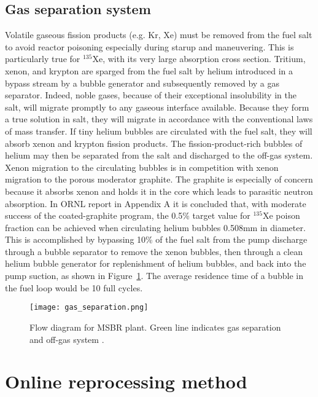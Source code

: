 \subsection{Gas separation system}
Volatile gaseous fission products (e.g. Kr, Xe) must be removed from the fuel salt to avoid reactor poisoning especially during starup and maneuvering. This is particularly true for $^{135}$Xe, with its very large absorption cross section. Tritium, xenon, and krypton are sparged from the fuel salt by helium introduced in a bypass stream by a bubble generator and subsequently removed by a gas separator. Indeed, noble gases, because of their exceptional insolubility in the salt, will migrate promptly to any gaseous interface available. Because they form a true solution in salt, they will migrate in accordance with the conventional laws of mass transfer.
If tiny helium bubbles are circulated with the fuel salt, they will absorb xenon and krypton fission products. The fission-product-rich bubbles of helium may then be separated from the salt and discharged to the off-gas system. Xenon migration to the circulating bubbles is in competition with xenon migration to the porous moderator graphite. The graphite is especially of concern because it absorbs xenon and holds it in the core which leads to parasitic neutron absorption. In \gls{ORNL} report \cite{robertson_conceptual_1971} in Appendix A it is concluded that, with moderate success of the coated-graphite program, the 0.5\% target value for $^{135}$Xe poison fraction can be achieved when circulating helium bubbles 0.508mm in diameter. This is accomplished by bypassing 10\% of the fuel salt from
the pump discharge through a bubble separator to remove the xenon bubbles, then through a clean helium bubble generator for replenishment of helium bubbles, and back into the pump suction, as shown in Figure~\ref{fig:gas_removal_system}. The average residence time of a bubble in the fuel loop would be 10 full cycles.

\begin{figure}[htp!] %
  \centering
  \vspace{-0.3em}
  \texttt{[image: gas\_separation.png]}
  \caption{Flow diagram for \gls{MSBR} plant. Green line indicates gas separation and off-gas system \cite{robertson_conceptual_1971}.}
  \vspace{-0.6em}
  \label{fig:gas_removal_system}
\end{figure}
\FloatBarrier
\section{Online reprocessing method}
